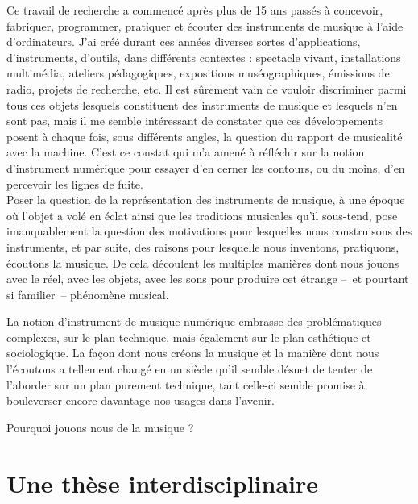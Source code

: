 \indent Ce travail de recherche a commencé après plus de 15 ans passés à concevoir, fabriquer, programmer, pratiquer et écouter des instruments de musique à l'aide d'ordinateurs. J'ai créé durant ces années diverses sortes d'applications, d'instruments, d'outils, dans différents contextes : spectacle vivant, installations multimédia, ateliers pédagogiques, expositions muséographiques, émissions de radio, projets de recherche, etc. Il est sûrement vain de vouloir discriminer parmi tous ces objets lesquels constituent des instruments de musique et lesquels n'en sont pas, mais il me semble intéressant de constater que ces développements posent à chaque fois, sous différents angles, la question du rapport de musicalité avec la machine.
C'est ce constat qui m'a amené à réfléchir sur la notion d'instrument numérique pour essayer d'en cerner les contours, ou du moins, d'en percevoir les lignes de fuite.\\
\indent Poser la question de la représentation des instruments de musique, à une époque où l’objet a volé en éclat ainsi que les traditions musicales qu’il sous-tend, pose imanquablement la question des motivations pour lesquelles nous construisons des instruments, et par suite, des raisons pour lesquelle nous inventons, pratiquons, écoutons la musique. De cela découlent les multiples manières dont nous jouons avec le réel, avec les objets, avec les sons pour produire cet étrange --~et pourtant si familier~-- phénomène musical.\\


\indent La notion d’instrument de musique numérique embrasse des problématiques complexes, sur le plan technique, mais également sur le plan esthétique et sociologique. La façon dont nous créons la musique et la manière dont nous l’écoutons a tellement changé en un siècle qu’il semble désuet de tenter de l’aborder sur un plan purement technique, tant celle-ci semble promise à bouleverser encore davantage nos usages dans l’avenir.

Pourquoi jouons nous de la musique ?


\section{Une thèse interdisciplinaire}

